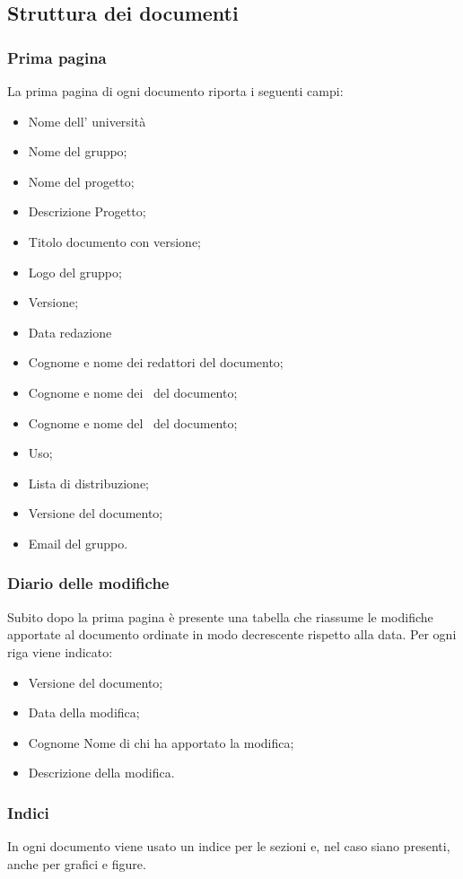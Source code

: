 \documentclass[../NormeDiProgetto.tex]{subfiles}
\begin{document}
		\subsection{Struttura dei documenti}
		
		\subsubsection{Prima pagina}
		La prima pagina di ogni documento riporta i seguenti campi:
		\begin{itemize}
			\item Nome dell' università
			\item Nome del gruppo;
			\item Nome del progetto;
			\item Descrizione Progetto;
			\item Titolo documento con versione;
			\item Logo del gruppo;
			\item Versione;
			\item Data redazione
			\item Cognome e nome dei redattori del documento;
			\item Cognome e nome dei \verificatori\ del documento;
			\item Cognome e nome del \responsabilediprogetto\ del documento;
			\item Uso;
			\item Lista di distribuzione;
			\item Versione del documento;
			\item Email del gruppo.
		\end{itemize} 
		\subsubsection{Diario delle modifiche}
		Subito dopo la prima pagina è presente una tabella che riassume le modifiche apportate al documento ordinate in modo decrescente rispetto alla data. Per ogni riga viene indicato:
		\begin{itemize}
			\item Versione del documento;
			\item Data della modifica;
			\item Cognome Nome di chi ha apportato la modifica;
			\item Descrizione della modifica.
		\end{itemize}
		\subsubsection{Indici}
		In ogni documento viene usato un indice per le sezioni e, nel caso siano presenti, anche per grafici e figure. 
\end{document}
